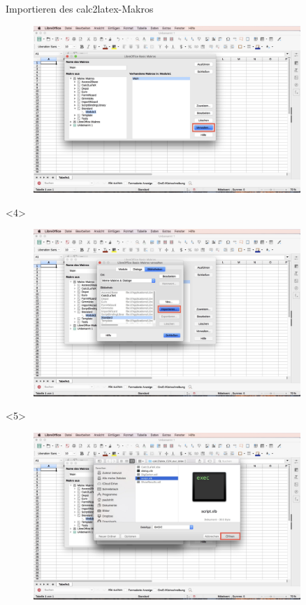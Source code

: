 \documentclass["WS\space 16-17\space -\space LaTeX-Kurs\space -\space Praesentation\space -\space 2.tex"]{subfiles}
\begin{document}
\begin{frame}[c]{Importieren des calc2latex-Makros}
\begin{onlyenv}
\begin{figure}[htbp]
			\centering
			\includegraphics[width=0.9\textwidth]{img/Bildschirmfoto_mitKasten/1_Importieren_Macro/3.jpg}
		\end{figure}
	\end{onlyenv}
	\begin{onlyenv}
		\begin{figure}[htbp]
			\centering
			\includegraphics[width=0.9\textwidth]{img/Bildschirmfoto_mitKasten/1_Importieren_Macro/4.jpg}
		\end{figure}
	\end{onlyenv}
	\begin{onlyenv}
		\begin{figure}[htbp]
			\centering
			\includegraphics[width=0.9\textwidth]{img/Bildschirmfoto_mitKasten/1_Importieren_Macro/5.jpg}

\end{figure}
\end{onlyenv}
\end{frame}
\end{document}
